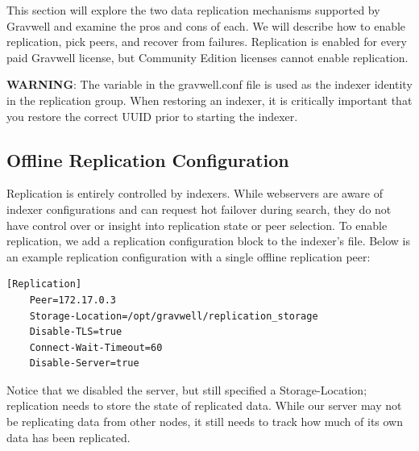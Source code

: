 {This section will explore the two data replication mechanisms supported
by Gravwell and examine the pros and cons of each. We will describe how
to enable replication, pick peers, and recover from failures.
Replication is enabled for every paid Gravwell license, but Community
Edition licenses cannot enable replication.

\textbf{WARNING}: The  variable in the gravwell.conf file is
used as the indexer identity in the replication group. When restoring
an indexer, it is critically important that you restore the correct UUID
prior to starting the indexer.

\subsection{Offline Replication Configuration}

Replication is entirely controlled by indexers. While webservers are
aware of indexer configurations and can request hot failover during
search, they do not have control over or insight into replication state
or peer selection. To enable replication, we add a replication
configuration block to the indexer's  file. Below is
an example replication configuration with a single offline replication
peer:

\begin{Verbatim}[breaklines=true]
[Replication]
    Peer=172.17.0.3
    Storage-Location=/opt/gravwell/replication_storage
    Disable-TLS=true
    Connect-Wait-Timeout=60
    Disable-Server=true
\end{Verbatim}

Notice that we disabled the server, but still specified a
Storage-Location; replication needs to store the state of replicated
data. While our server may not be replicating data from other nodes, it
still needs to track how much of its own data has been replicated.

}
